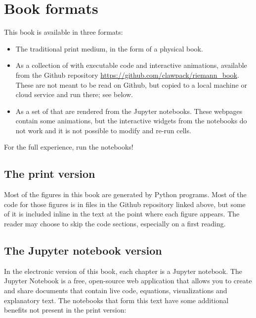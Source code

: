 \documentclass{SIAMbook2016}
\begin{document}
\hypertarget{book-formats}{%
\section*{Book formats}\label{book-formats}}

This book is available in three formats:

\begin{itemize}
\item
  The traditional print medium, in the form of a physical book.
\item
  As a collection of  with
  executable code and interactive animations, available from the Github
  repository \url{https://github.com/clawpack/riemann_book}. These are
  not meant to be read on Github, but copied to a local machine or cloud
  service and run there; see below.
\item
  As a set of
  that are rendered from the Jupyter notebooks. These webpages contain
  some animations, but the interactive widgets from the notebooks do not
  work and it is not possible to modify and re-run cells.
\end{itemize}

For the full experience, run the notebooks!

\hypertarget{the-print-version}{%
\subsection*{The print version}\label{the-print-version}}

Most of the figures in this book are generated by Python programs. Most
of the code for those figures is in files in the Github repository
linked above, but some of it is included inline in the text at the point
where each figure appears. The reader may choose to skip the code
sections, especially on a first reading.

\hypertarget{the-jupyter-notebook-version}{%
\subsection*{The Jupyter notebook
version}\label{the-jupyter-notebook-version}}

In the electronic version of this book, each chapter is a Jupyter
notebook. 
The Jupyter Notebook is a free, open-source web application
that allows you to create and share documents that contain live code,
equations, visualizations and explanatory text. The notebooks that form
this text have some additional benefits not present in the print
version:
\end{document}
